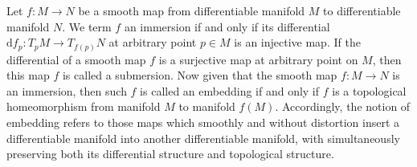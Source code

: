 \par Let $f:M\rightarrow N$ be a smooth map from differentiable manifold $M$ to differentiable manifold $N$. We term $f$ an immersion if and only if its differential $\mathrm{d}f_{p}:T_{p}M\rightarrow T_{f\left(p\right)}N$ at arbitrary point $p\in M$ is an injective map. If the differential of a smooth map $f$ is a surjective map at arbitrary point on $M$, then this map $f$ is called a submersion. Now given that the smooth map $f:M\rightarrow N$ is an immersion, then such $f$ is called an embedding if and only if $f$ is a topological homeomorphism from manifold $M$ to manifold $f\left(M\right)$. Accordingly, the notion of embedding refers to those maps which smoothly and without distortion insert a differentiable manifold into another differentiable manifold, with simultaneously preserving both its differential structure and topological structure.


